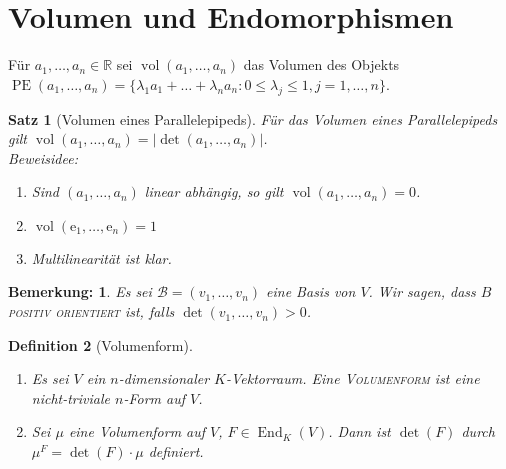 \documentclass{report}
\newcommand{\IN}[1]{\index{#1|BH}}
\newcommand{\lb}{\lambda}
\newcommand{\ee}{\mathrm{e}}
\newcommand{\R}{\mathbb{R}}
\newcommand{\baseb}{\mathcal{B}}
\DeclareMathOperator{\End}{End}
\DeclareMathOperator{\vol}{vol}
\DeclareMathOperator{\PE}{PE}
\theoremstyle{customrem}
\newtheorem*{bemerkung}{Bemerkung\textnormal:}
\theoremstyle{customdef}
\newtheorem{definition}{Definition}[chapter]
\newtheorem{satz}[definition]{Satz}
\theoremstyle{customenv}
\newcommand{\defemph}[1]{\textsc{#1}}
\begin{document}
\section{Volumen und Endomorphismen}
Für \(a_1,\ldots, a_n\in\R\) sei \(\vol(a_1,\ldots, a_n)\) das Volumen des Objekts \(\PE(a_1,\ldots, a_n) = \{\lb_1a_1+\ldots+\lb_na_n:0\leq\lb_j\leq1,j=1,\ldots,n\}\).

	\begin{satz}[Volumen eines Parallelepipeds]
		Für das Volumen eines Parallelepipeds gilt \(\vol(a_1,\ldots, a_n) = |\det(a_1,\ldots, a_n)|\).\\

		\pagebreak[2]\textit{Beweisidee}:
		\begin{enumerate}[label = \roman*)]
			\item Sind \((a_1,\ldots, a_n)\) linear abhängig, so gilt \(\vol(a_1,\ldots, a_n) = 0\).
			\item \(\vol(\ee_1,\ldots, \ee_n) = 1\)
			\item Multilinearität ist klar.
		\end{enumerate}
	\end{satz}

\begin{bemerkung}
	Es sei \(\baseb = (v_1,\ldots, v_n)\) eine Basis von \(V\). Wir sagen, dass \(B\) \defemph{positiv orientiert} ist, falls \(\det(v_1,\ldots, v_n) > 0\).
\end{bemerkung}

	\begin{definition}[Volumenform]\( \)\vspace{-.5cm} %
		\IN{Volumenform}
		\begin{enumerate}[label = \roman*)]
			\item Es sei \(V\) ein \(n\)-dimensionaler \(K\)-Vektorraum. Eine \defemph{Volumenform} ist eine nicht-triviale \(n\)-Form auf \(V\).
			\item Sei \(\mu\) eine Volumenform auf \(V\), \(F\in\End_K(V)\). Dann ist \(\det(F)\) durch \(\mu^F = \det(F)\cdot\mu\) definiert.
		\end{enumerate}
	\end{definition}
\end{document}
